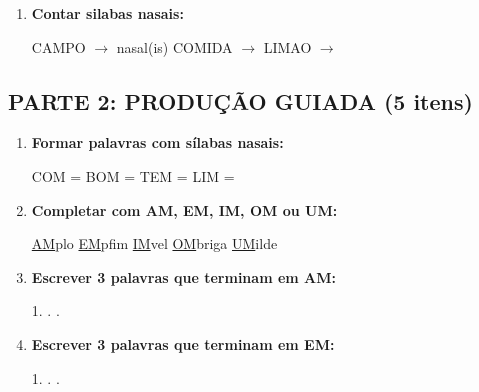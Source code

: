 \begin{exercicio}
\begin{enumerate}
  \item \textbf{Contar silabas nasais:}
  \begin{center}
  CAMPO $\rightarrow$ \underline{\hspace{1cm}} nasal(is) \quad COMIDA $\rightarrow$ \underline{\hspace{1cm}} \quad LIMAO $\rightarrow$ \underline{\hspace{1cm}}
  \end{center}
\end{enumerate}

\subsection*{PARTE 2: PRODUÇÃO GUIADA (5 itens)}

\begin{enumerate}[resume]
  \item \textbf{Formar palavras com sílabas nasais:}
  \begin{center}
  COM = \underline{\hspace{2cm}} \quad BOM = \underline{\hspace{2cm}} \quad TEM = \underline{\hspace{2cm}} \quad LIM = \underline{\hspace{2cm}}
  \end{center}

  \item \textbf{Completar com AM, EM, IM, OM ou UM:}
  \begin{center}
  \underline{AM}plo \quad \underline{EM}pfim \quad \underline{IM}vel \quad \underline{OM}briga \quad \underline{UM}ilde
  \end{center}

  \item \textbf{Escrever 3 palavras que terminam em AM:}
  \begin{center}
  1. \underline{\hspace{3cm}} . \underline{\hspace{3cm}} . \underline{\hspace{3cm}}
  \end{center}

  \item \textbf{Escrever 3 palavras que terminam em EM:}
  \begin{center}
  1. \underline{\hspace{3cm}} . \underline{\hspace{3cm}} . \underline{\hspace{3cm}}
  \end{center}


\end{enumerate}
\end{exercicio}
